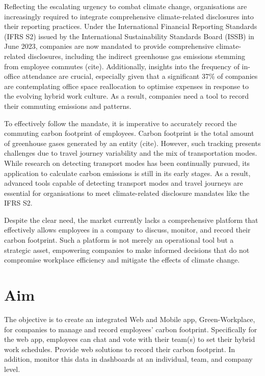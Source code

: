 \documentclass{l4proj}
\begin{document}
Reflecting the escalating urgency to combat climate change, organisations are increasingly required to integrate comprehensive climate-related disclosures into their reporting practices. Under the International Financial Reporting Standards (IFRS S2) issued by the International Sustainability Standards Board (ISSB) in June 2023, companies are now mandated to provide comprehensive climate-related disclosures, including the indirect greenhouse gas emissions stemming from employee commutes (cite). Additionally, insights into the frequency of in-office attendance are crucial, especially given that a significant 37\% of companies are contemplating office space reallocation to optimise expenses in response to the evolving hybrid work culture. As a result, companies need a tool to record their commuting emissions and patterns.

To effectively follow the mandate, it is imperative to accurately record the commuting carbon footprint of employees. Carbon footprint is the total amount of greenhouse gases generated by an entity (cite). However, such tracking presents challenges due to travel journey variability and the mix of transportation modes. While research on detecting transport modes has been continually pursued, its application to calculate carbon emissions is still in its early stages. As a result, advanced tools capable of detecting transport modes and travel journeys are essential for organisations to meet climate-related disclosure mandates like the IFRS S2. 

Despite the clear need, the market currently lacks a comprehensive platform that effectively allows employees in a company to discuss, monitor, and record their carbon footprint. Such a platform is not merely an operational tool but a strategic asset, empowering companies to make informed decisions that do not compromise workplace efficiency and mitigate the effects of climate change.

\section{Aim}

The objective is to create an integrated Web and Mobile app, Green-Workplace, for companies to manage and record employees' carbon footprint. Specifically for the web app, employees can chat and vote with their team(s) to set their hybrid work schedules. Provide web solutions to record their carbon footprint. In addition, monitor this data in dashboards at an individual, team, and company level.
\end{document}
